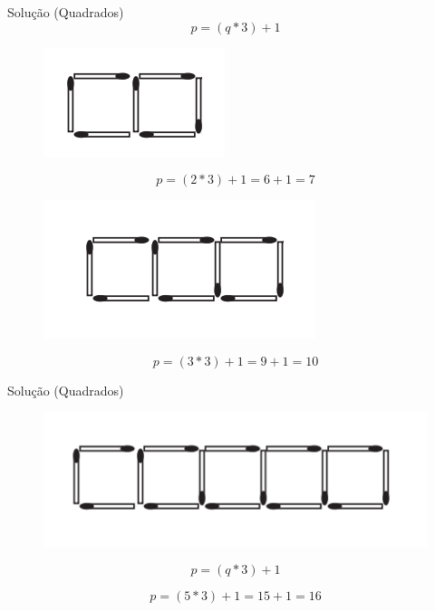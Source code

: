 \documentclass{beamer}
\begin{document}


\begin{frame}{Solução (Quadrados)}
\begin{equation*}
    p = (q \ast 3) + 1
\end{equation*}

\begin{figure}[ht]
\centering
\includegraphics[width=.2\textwidth]{2qua.png}
\label{fig:exampleFig2}
\end{figure}

\begin{equation*}
    p = (2 \ast 3) + 1 = 6 + 1 =7
\end{equation*}

\begin{figure}[ht]
\centering
\includegraphics[width=.3\textwidth]{3qua.png}
\label{fig:exampleFig2}
\end{figure}

\begin{equation*}
    p = (3 \ast 3) + 1 = 9 + 1 = 10
\end{equation*}

\end{frame}




\begin{frame}{Solução (Quadrados)}
\begin{figure}[ht]
\centering
\includegraphics[width=.6\textwidth]{5qua.png}
\label{fig:exampleFig2}
\end{figure}

\begin{equation*}
    p = (q \ast 3) + 1 
\end{equation*}

\begin{equation*}
    p = (5 \ast 3) + 1 = 15 + 1 = 16
\end{equation*}

\end{frame}
\end{document}
